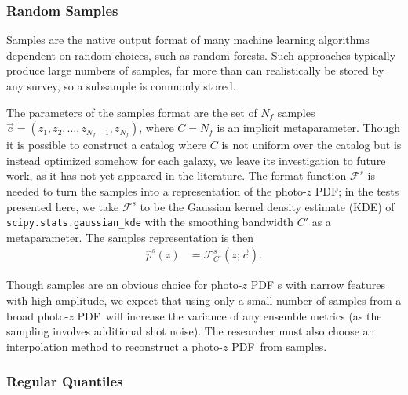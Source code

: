 \documentclass[\docopts]{\docclass}
\newcommand{\pz}{photo-$z$ PDF\xspace}
\begin{document}
\subsubsection{Random Samples}
\label{sec:samples}

Samples are the native output format of many machine learning algorithms
dependent on random choices, such as random forests.
Such approaches typically produce large numbers of samples, far more than can
realistically be stored by any survey, so a subsample is commonly stored.

The parameters of the samples format are the set of $N_{f}$ samples
$\vec{c}=(z_{1}, z_{2}, \dots, z_{N_{f}-1}, z_{N_{f}})$, where $C=N_{f}$ is an
implicit metaparameter.  Though it is possible to construct a catalog where $C$
is not uniform over the catalog but is instead optimized somehow for each galaxy, we leave its investigation to future work, as
it has not yet appeared in the literature.  The format function
$\mathcal{F}^{s}$ is needed to turn the samples into a representation of the \pz; in the tests
presented here, we take $\mathcal{F}^{s}$ to be the Gaussian kernel density estimate (KDE) of
\texttt{scipy.stats.gaussian\_kde} with the smoothing bandwidth $C'$ as a
metaparameter.  The samples representation is then
\begin{align}
  \label{eq:sampled}
  \hat{p}^{s}(z) &= \mathcal{F}^{s}_{C'}(z; \vec{c}).
\end{align}

Though samples are an obvious choice for \pz s with narrow features with high
amplitude, we expect that using only a small number of samples from a broad \pz\ will increase the variance of any ensemble metrics
(as the sampling involves additional shot noise).  The researcher must also choose an interpolation method to
reconstruct a \pz\ from samples.


\subsubsection{Regular Quantiles}
\label{sec:quantiles}
\end{document}
